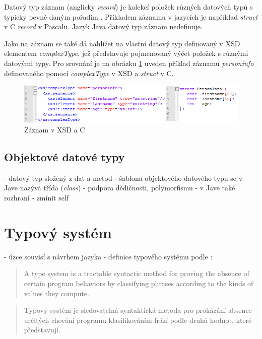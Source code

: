 \documentclass[czech,DP]{thesiskiv}
\begin{document}
Datový typ záznam (anglicky \textit{record}) je kolekcí položek různých datových typů s typicky pevně daným pořadím \cite{felleisen2001}. Příkladem záznamu v jazycích je například \textit{struct} v C \textit{record} v Pascalu. Jazyk Java datový typ záznam nedefinuje.

Jako na záznam se také dá nahlížet na vlastní datový typ definovaný v XSD elementem \textit{complexType}, jež představuje pojmenovaný výčet položek s různými datovými typy. Pro srovnání je na obrázku \ref{fig:record-xsd-c} uveden příklad záznamu \textit{personinfo} definovaného pomocí \textit{complexType} v XSD a \textit{struct} v C.

\begin{figure}[h]
	\centering
	\includegraphics[width=\linewidth]{record-example}
	\caption{Záznam v XSD a C}
	\label{fig:record-xsd-c}
\end{figure}
 

\subsection{Objektové datové typy}

 - datový typ složený z dat a metod
 - šablona objektového datového typu se v Jave nazývá třída (\textit{class})
 - podpora dědičnosti, polymorfismu
 - v Jave také rozhraní 
 - zmínit self
 

\section{Typový systém}

- úzce souvisí s návrhem jazyka
- definice typového systému podle \cite{pierce2002}:

\begin{quote}
A type system is a tractable syntactic method for proving the absence of
certain program behaviors by classifying phrases according to the kinds
of values they compute.
\end{quote}

\begin{quote}
	Typový systém je sledovatelná syntaktická metoda pro prokázání absence určitých chování programu klasifikováním frází podle druhů hodnot, které představují.
\end{quote}
\end{document}
